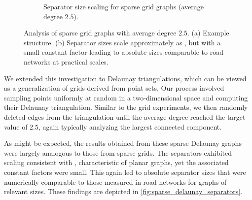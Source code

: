 \begin{figure}
\begin{subfigure}{0.55\linewidth}
		\caption{Separator size scaling for sparse grid graphs (average degree \(2.5\)).}
		\label{fig:sparse_grid_sep_plot} %
	\end{subfigure}
	\caption{Analysis of sparse grid graphs with average degree \(2.5\). (a) Example structure. (b) Separator sizes scale approximately as , but with a small constant factor leading to absolute sizes comparable to road networks at practical scales.}
	\label{fig:sparse_grid_separators} %
\end{figure}

We extended this investigation to Delaunay triangulations, which can be viewed as a generalization of grids derived from point sets.
Our process involved sampling points uniformly at random in a two-dimensional space and computing their Delaunay triangulation.
Similar to the grid experiments, we then randomly deleted edges from the triangulation until the average degree reached the target value of \(2.5\), again typically analyzing the largest connected component.

As might be expected, the results obtained from these sparse Delaunay graphs were largely analogous to those from sparse grids.
The separators exhibited scaling consistent with , characteristic of planar graphs, yet the associated constant factors were small.
This again led to absolute separator sizes that were numerically comparable to those measured in road networks for graphs of relevant sizes.
These findings are depicted in \cref{fig:sparse_delaunay_separators}.

